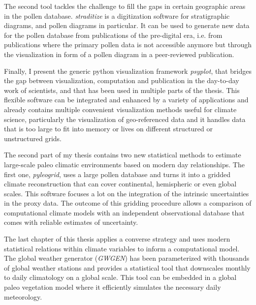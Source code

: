 \begin{thesisabstract}[]
The second tool tackles the challenge to fill the gaps in certain geographic areas in the pollen database. \textit{straditize} is a digitization software for stratigraphic diagrams, and pollen diagrams in particular. It can be used to generate new data for the pollen database from publications of the pre-digital era, i.e. from publications where the primary pollen data is not accessible anymore but through the visualization in form of a pollen diagram in a peer-reviewed publication.

Finally, I present the generic python visualization framework \textit{psyplot}, that bridges the gap between visualization, computation and publication in the day-to-day work of scientists, and that has been used in multiple parts of the thesis. This flexible software can be integrated and enhanced by a variety of applications and already contains multiple convenient visualization methods useful for climate science, particularly the visualization of geo-referenced data and it handles data that is too large to fit into memory or lives on different structured or unstructured grids.

The second part of my thesis contains two new statistical methods to estimate large-scale paleo climatic environments based on modern day relationships. The first one, \textit{pyleogrid}, uses a large pollen database and turns it into a gridded climate reconstruction that can cover continental, hemispheric or even global scales. This software focuses a lot on the integration of the intrinsic uncertainties in the proxy data. The outcome of this gridding procedure allows a comparison of computational climate models with an independent observational database that comes with reliable estimates of uncertainty.

The last chapter of this thesis applies a converse strategy and uses modern statistical relations within climate variables to inform a computational model. The global weather generator (\textit{GWGEN}) has been parameterized with thousands of global weather stations and provides a statistical tool that downscales monthly to daily climatology on a global scale. This tool can be embedded in a global paleo vegetation model where it efficiently simulates the necessary daily meteorology.
\end{thesisabstract}

\cleardoublepage

